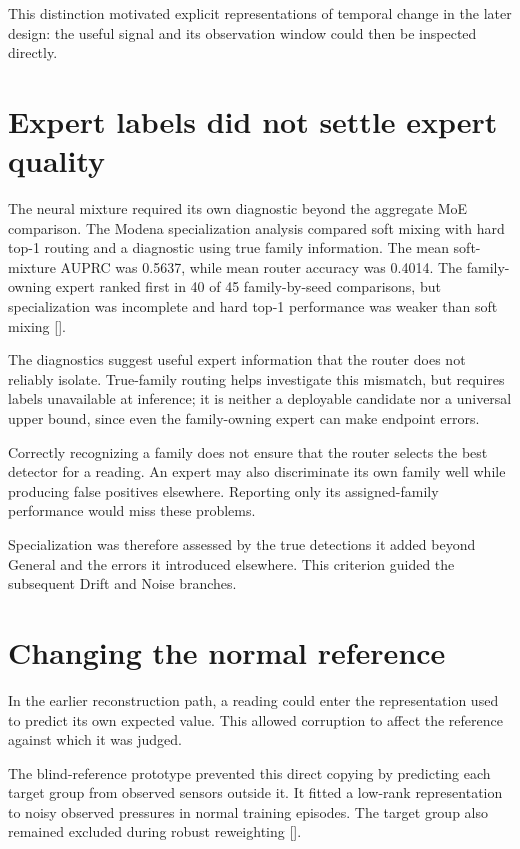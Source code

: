 This distinction motivated explicit representations of temporal change in the later design: the useful signal and its observation window could then be inspected directly.

\section{Expert labels did not settle expert quality}
The neural mixture required its own diagnostic beyond the aggregate MoE comparison. The Modena specialization analysis compared soft mixing with hard top-1 routing and a diagnostic using true family information. The mean soft-mixture AUPRC was 0.5637, while mean router accuracy was 0.4014. The family-owning expert ranked first in 40 of 45 family-by-seed comparisons, but specialization was incomplete and hard top-1 performance was weaker than soft mixing [].

The diagnostics suggest useful expert information that the router does not reliably isolate. True-family routing helps investigate this mismatch, but requires labels unavailable at inference; it is neither a deployable candidate nor a universal upper bound, since even the family-owning expert can make endpoint errors.

Correctly recognizing a family does not ensure that the router selects the best detector for a reading. An expert may also discriminate its own family well while producing false positives elsewhere. Reporting only its assigned-family performance would miss these problems.

Specialization was therefore assessed by the true detections it added beyond General and the errors it introduced elsewhere. This criterion guided the subsequent Drift and Noise branches.

\section{Changing the normal reference}
In the earlier reconstruction path, a reading could enter the representation used to predict its own expected value. This allowed corruption to affect the reference against which it was judged.

The blind-reference prototype prevented this direct copying by predicting each target group from observed sensors outside it. It fitted a low-rank representation to noisy observed pressures in normal training episodes. The target group also remained excluded during robust reweighting [].

